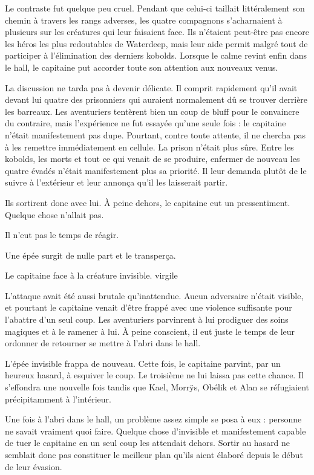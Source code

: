 Le contraste fut quelque peu cruel. Pendant que celui-ci taillait littéralement son chemin à travers les rangs adverses, les quatre compagnons s'acharnaient à plusieurs sur les créatures qui leur faisaient face. Ils n'étaient peut-être pas encore les héros les plus redoutables de Waterdeep, mais leur aide permit malgré tout de participer à l'élimination des derniers kobolds. Lorsque le calme revint enfin dans le hall, le capitaine put accorder toute son attention aux nouveaux venus.

La discussion ne tarda pas à devenir délicate. Il comprit rapidement qu'il avait devant lui quatre des prisonniers qui auraient normalement dû se trouver derrière les barreaux. Les aventuriers tentèrent bien un coup de bluff pour le convaincre du contraire, mais l'expérience ne fut essayée qu'une seule fois : le capitaine n'était manifestement pas dupe. Pourtant, contre toute attente, il ne chercha pas à les remettre immédiatement en cellule. La prison n'était plus sûre. Entre les kobolds, les morts et tout ce qui venait de se produire, enfermer de nouveau les quatre évadés n'était manifestement plus sa priorité. Il leur demanda plutôt de le suivre à l'extérieur et leur annonça qu'il les laisserait partir.

Ils sortirent donc avec lui. À peine dehors, le capitaine eut un pressentiment. Quelque chose n'allait pas.

Il n'eut pas le temps de réagir.

Une épée surgit de nulle part et le transperça.

{Le capitaine face à la créature invisible.}
{virgile}

L'attaque avait été aussi brutale qu'inattendue. Aucun adversaire n'était visible, et pourtant le capitaine venait d'être frappé avec une violence suffisante pour l'abattre d'un seul coup. Les aventuriers parvinrent à lui prodiguer des soins magiques et à le ramener à lui. À peine conscient, il eut juste le temps de leur ordonner de retourner se mettre à l'abri dans le hall.

L'épée invisible frappa de nouveau. Cette fois, le capitaine parvint, par un heureux hasard, à esquiver le coup. Le troisième ne lui laissa pas cette chance. Il s'effondra une nouvelle fois tandis que Kael, Morrÿs, Obélik et Alan se réfugiaient précipitamment à l'intérieur.

Une fois à l'abri dans le hall, un problème assez simple se posa à eux : personne ne savait vraiment quoi faire. Quelque chose d'invisible et manifestement capable de tuer le capitaine en un seul coup les attendait dehors. Sortir au hasard ne semblait donc pas constituer le meilleur plan qu'ils aient élaboré depuis le début de leur évasion.

